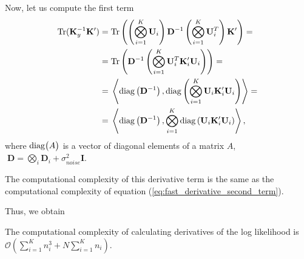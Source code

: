 Now, let us compute the first term
\begin{equation}
  \begin{split}
    {\rm Tr}(\mathbf{K}_y^{-1} \mathbf{K}') = &\; {\rm Tr} \left (
      \left (\bigotimes_{i = 1}^K \mathbf{U}_i \right ) \mathbf{D}^{-1} \left (\bigotimes_{i = 1}^K \mathbf{U}_i^T \right ) \mathbf{K}'
    \right)= \\
    = &\; {\rm Tr} \left (\mathbf{D}^{-1} \left (\bigotimes_{i = 1}^K \mathbf{U}_i^T \mathbf{K}_i' \mathbf{U}_i \right ) \right ) = \\
    = &\; \left < {\rm diag} \left (\mathbf{D}^{-1} \right ), {\rm diag} \left (\bigotimes_{i = 1}^K \mathbf{U}_i \mathbf{K}_i' \mathbf{U}_i \right ) \right > = \\
    = &\; \left < {\rm diag} \left (\mathbf{D}^{-1} \right ),  \bigotimes_{i = 1}^K {\rm diag} \left ( \mathbf{U}_i \mathbf{K}_i' \mathbf{U}_i \right ) \right >,
  \end{split}
\end{equation}
where ${\rm diag}\big(A \big)$ is a vector of diagonal elements of a matrix $A$,
$\; \mathbf{D} = \bigotimes_i \mathbf{D}_i + \sigma_{noise}^2 \mathbf{I}$.


The computational complexity of this derivative term is the same as the computational
complexity of equation (\ref{eq:fast_derivative_second_term}).

Thus, we obtain
\begin{proposition}
  The computational complexity of calculating derivatives of the log likelihood is
  ${\mathcal{O}\left (\sum\limits_{i = 1}^K n_i^3 + N \sum\limits_{i = 1}^K n_i \right )}$.
\end{proposition}

